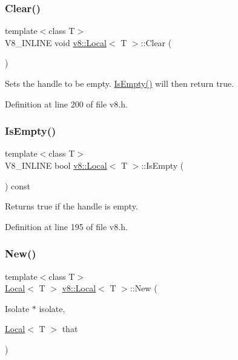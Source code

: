 \subsubsection{\texorpdfstring{Clear()}{Clear()}}
{\footnotesize\ttfamily template$<$class T$>$ \\
V8\+\_\+\+I\+N\+L\+I\+NE void \mbox{\hyperlink{classv8_1_1Local}{v8\+::\+Local}}$<$ T $>$\+::Clear (\begin{DoxyParamCaption}{ }\end{DoxyParamCaption})\hspace{0.3cm}{\ttfamily [inline]}}

Sets the handle to be empty. \mbox{\hyperlink{classv8_1_1Local_aeec81dfca98e0d5b2f26ae13c2d141f4}{Is\+Empty()}} will then return true. 

Definition at line 200 of file v8.\+h.

\mbox{\label{classv8_1_1Local_aeec81dfca98e0d5b2f26ae13c2d141f4}} 
\subsubsection{\texorpdfstring{Is\+Empty()}{IsEmpty()}}
{\footnotesize\ttfamily template$<$class T$>$ \\
V8\+\_\+\+I\+N\+L\+I\+NE bool \mbox{\hyperlink{classv8_1_1Local}{v8\+::\+Local}}$<$ T $>$\+::Is\+Empty (\begin{DoxyParamCaption}{ }\end{DoxyParamCaption}) const\hspace{0.3cm}{\ttfamily [inline]}}

Returns true if the handle is empty. 

Definition at line 195 of file v8.\+h.

\mbox{\label{classv8_1_1Local_a1b3c386fb10d9e8f67aecec9174de1fa}} 
\subsubsection{\texorpdfstring{New()}{New()}}
{\footnotesize\ttfamily template$<$class T$>$ \\
\mbox{\hyperlink{classv8_1_1Local}{Local}}$<$ T $>$ \mbox{\hyperlink{classv8_1_1Local}{v8\+::\+Local}}$<$ T $>$\+::New (\begin{DoxyParamCaption}\item[{Isolate $\ast$}]{isolate,  }\item[{\mbox{\hyperlink{classv8_1_1Local}{Local}}$<$ T $>$}]{that }\end{DoxyParamCaption})\hspace{0.3cm}{\ttfamily [static]}}

